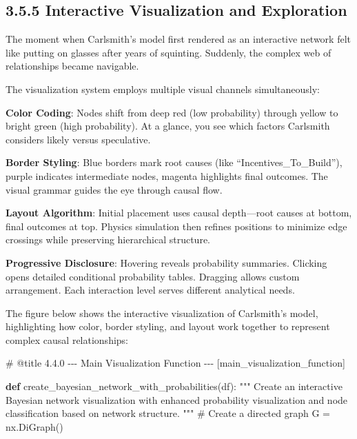\documentclass[
  11pt,
  letterpaper,
]{book}
\newenvironment{Shaded}{\begin{snugshade}}{\end{snugshade}}
\newcommand{\CommentTok}[1]{\textcolor[rgb]{0.37,0.37,0.37}{#1}}
\newcommand{\KeywordTok}[1]{\textcolor[rgb]{0.00,0.23,0.31}{\textbf{#1}}}
\newcommand{\NormalTok}[1]{\textcolor[rgb]{0.00,0.23,0.31}{#1}}
\newcommand{\OperatorTok}[1]{\textcolor[rgb]{0.37,0.37,0.37}{#1}}
\begin{document}
\begin{landscape}
\subsection{3.5.5 Interactive Visualization and
Exploration}\label{sec-interactive-visualization}

The moment when Carlsmith's model first rendered as an interactive
network felt like putting on glasses after years of squinting. Suddenly,
the complex web of relationships became navigable.

The visualization system employs multiple visual channels
simultaneously:

\textbf{Color Coding}: Nodes shift from deep red (low probability)
through yellow to bright green (high probability). At a glance, you see
which factors Carlsmith considers likely versus speculative.

\textbf{Border Styling}: Blue borders mark root causes (like
``Incentives\_To\_Build''), purple indicates intermediate nodes, magenta
highlights final outcomes. The visual grammar guides the eye through
causal flow.

\textbf{Layout Algorithm}: Initial placement uses causal depth---root
causes at bottom, final outcomes at top. Physics simulation then refines
positions to minimize edge crossings while preserving hierarchical
structure.

\textbf{Progressive Disclosure}: Hovering reveals probability summaries.
Clicking opens detailed conditional probability tables. Dragging allows
custom arrangement. Each interaction level serves different analytical
needs.

The figure below shows the interactive visualization of Carlsmith's
model, highlighting how color, border styling, and layout work together
to represent complex causal relationships:

\label{main_visualization_function}
\begin{Shaded}
\begin{Highlighting}[]
\CommentTok{\# @title 4.4.0 {-}{-}{-} Main Visualization Function {-}{-}{-} [main\_visualization\_function]}

\KeywordTok{def}\NormalTok{ create\_bayesian\_network\_with\_probabilities(df):}
    \CommentTok{"""}
\CommentTok{    Create an interactive Bayesian network visualization with enhanced}
\CommentTok{    probability visualization and node classification based on network structure.}
\CommentTok{    """}
    \CommentTok{\# Create a directed graph}
\NormalTok{    G }\OperatorTok{=}\NormalTok{ nx.DiGraph()}


\end{Highlighting}
\end{Shaded}
\end{landscape}
\end{document}
